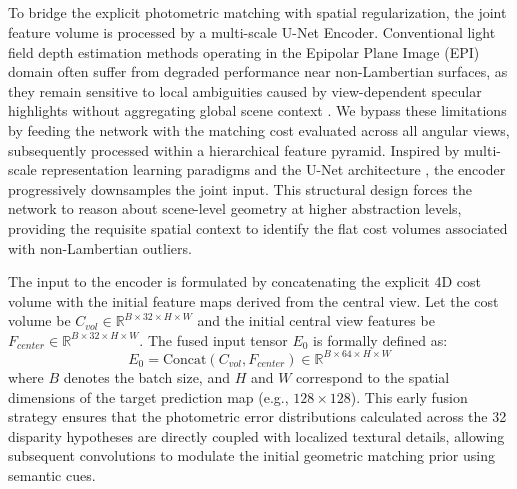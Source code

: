 \documentclass[lettersize,journal]{IEEEtran}
\begin{document}
\subsection{}

To bridge the explicit photometric matching with spatial regularization, the joint feature volume is processed by a multi-scale U-Net Encoder. Conventional light field depth estimation methods operating in the Epipolar Plane Image (EPI) domain often suffer from degraded performance near non-Lambertian surfaces, as they remain sensitive to local ambiguities caused by view-dependent specular highlights without aggregating global scene context \cite{heber2018, lyu2022}. We bypass these limitations by feeding the network with the matching cost evaluated across all angular views, subsequently processed within a hierarchical feature pyramid. Inspired by multi-scale representation learning paradigms \cite{eigen2014} and the U-Net architecture \cite{ronneberger2015}, the encoder progressively downsamples the joint input. This structural design forces the network to reason about scene-level geometry at higher abstraction levels, providing the requisite spatial context to identify the flat cost volumes associated with non-Lambertian outliers.

The input to the encoder is formulated by concatenating the explicit 4D cost volume with the initial feature maps derived from the central view. Let the cost volume be $C_{vol} \in \mathbb{R}^{B \times 32 \times H \times W}$ and the initial central view features be $F_{center} \in \mathbb{R}^{B \times 32 \times H \times W}$. The fused input tensor $E_0$ is formally defined as:
\begin{equation}
E_0 = \text{Concat}(C_{vol}, F_{center}) \in \mathbb{R}^{B \times 64 \times H \times W}
\end{equation}
where $B$ denotes the batch size, and $H$ and $W$ correspond to the spatial dimensions of the target prediction map (e.g., $128 \times 128$). This early fusion strategy ensures that the photometric error distributions calculated across the 32 disparity hypotheses are directly coupled with localized textural details, allowing subsequent convolutions to modulate the initial geometric matching prior using semantic cues.
\end{document}
